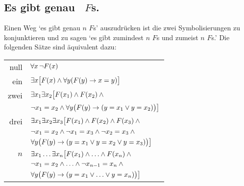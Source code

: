 \subsection*{Es gibt genau \blank\ $F$s.}
\label{summary.exactly}

Einen Weg `es gibt genau $n$ $F$s' auszudrücken ist die zwei Symbolisierungen zu konjunktieren und zu sagen `es gibt zumindest $n$ $F$s und zumeist $n$ $F$s.' Die folgenden Sätze sind äquivalent dazu:
\begin{tabular*}{\textwidth}{rl}
null & $\forall x\,\neg \mathord{F}(x)$\\
ein & $\exists x\bigl[\mathord{F}(x) \wedge \forall y(\mathord{F}(y) \rightarrow x = y)\bigr]$\\
zwei & $\exists x_1\exists x_2\bigl[\mathord{F}(x_1) \wedge \mathord{F}(x_2) \wedge {}$\\
& $\neg x_1 = x_2 \wedge \forall y\bigl(\mathord{F}(y) \rightarrow (y= x_1 \vee y = x_2)\bigr) \bigr]$\\
drei & $\exists x_1\exists x_2\exists x_3\bigl[\mathord{F}(x_1) \wedge \mathord{F}(x_2) \wedge \mathord{F}(x_3) \wedge {}$\\
& $\neg x_1 =  x_2 \wedge \neg  x_1 = x_3 \wedge \neg x_2 = x_3 \wedge {}$\\
& $\forall y\bigl(\mathord{F}(y) \rightarrow (y = x_1 \vee y = x_2 \vee y =  x_3)\bigr) \bigr]$\\
$n$ & $\exists x_1\ldots\exists x_n\bigl[\mathord{F}(x_1) \wedge\ldots\wedge \mathord{F}(x_n)  \wedge {}$\\
&$ \neg x_1 = x_2 \wedge\ldots\wedge \neg x_{n-1}= x_n \wedge \phantom{.}$\\
& $\forall y\bigl(\mathord{F}(y) \rightarrow (y= x_1 \vee \ldots \vee y= x_n)\bigr)\bigr]$ 
\end{tabular*}


